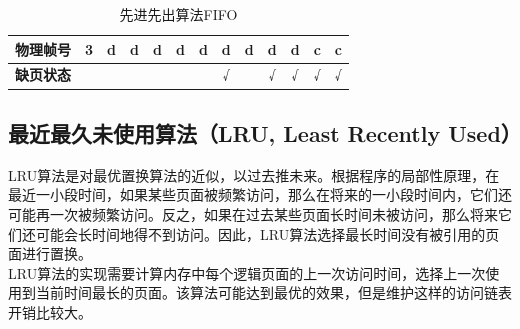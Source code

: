 \begin{table}[H]
\begin{tabular}{|clc|c|c|c|c|c|c|c|c|c|c|c|}
		\multicolumn{2}{|c|}{\multirow{-4}{*}{\textbf{物理帧号}}} & \textbf{3} & d          & {\color[HTML]{333333} d} & {\color[HTML]{333333} d} & {\color[HTML]{FE0000} d} & {\color[HTML]{333333} d} & {\color[HTML]{333333} d} & {\color[HTML]{333333} d} & {\color[HTML]{333333} d} & {\color[HTML]{333333} d} & {\color[HTML]{FE0000} c} & c                        \\ \hline
		\multicolumn{2}{|c|}{\textbf{缺页状态}}                   &            &            &                          &                          &                          &                          & √                        &                          & √                        & √                        & √                        & √                        \\ \hline
	\end{tabular}
	\caption{先进先出算法FIFO}
\end{table}

\subsection{最近最久未使用算法（LRU, Least Recently Used）}

LRU算法是对最优置换算法的近似，以过去推未来。根据程序的局部性原理，在最近一小段时间，如果某些页面被频繁访问，那么在将来的一小段时间内，它们还可能再一次被频繁访问。反之，如果在过去某些页面长时间未被访问，那么将来它们还可能会长时间地得不到访问。因此，LRU算法选择最长时间没有被引用的页面进行置换。 \\

LRU算法的实现需要计算内存中每个逻辑页面的上一次访问时间，选择上一次使用到当前时间最长的页面。该算法可能达到最优的效果，但是维护这样的访问链表开销比较大。

